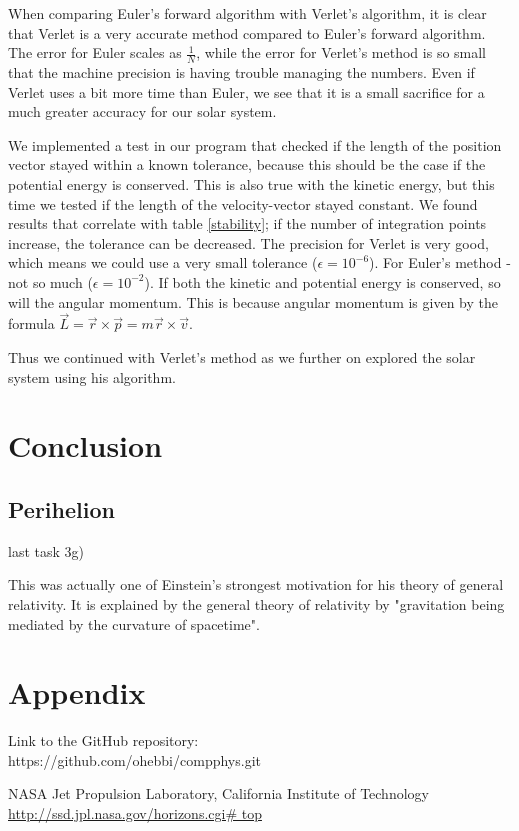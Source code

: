 \documentclass{article}
\begin{document}
When comparing Euler's forward algorithm with Verlet's algorithm, it is clear that Verlet is a very accurate method compared to Euler's forward algorithm. The error for Euler scales as $\frac{1}{N}$, while the error for Verlet's method is so small that the machine precision is having trouble managing the numbers. Even if Verlet uses a bit more time than Euler, we see that it is a small sacrifice for a much greater accuracy for our solar system.

We implemented a test in our program that checked if the length of the position vector stayed within a known tolerance, because this should be the case if the potential energy is conserved.
This is also true with the kinetic energy, but this time we tested if the length of the velocity-vector stayed constant. We found results that correlate with table \ref{stability}; if the number of integration points increase, the tolerance can be decreased. The precision for Verlet is very good, which means we could use a very small tolerance ($\epsilon = 10^{-6}$). For Euler's method - not so much ($\epsilon = 10^{-2}$).
If both the kinetic and potential energy is conserved, so will the angular momentum. This is because angular momentum is given by the formula $\vec{L}=\vec{r} \times \vec{p} =m \vec{r} \times \vec{v}$.


Thus we continued with Verlet's method as we further on explored the solar system using his algorithm.

\section{Conclusion}


\subsection{Perihelion}
last task 3g)

This was actually one of Einstein's strongest motivation for his theory of general relativity.
It is explained by the general theory of relativity by "gravitation being mediated by the curvature of spacetime".


\section{Appendix}
Link to the GitHub repository:\\

https://github.com/ohebbi/compphys.git

\begin{thebibliography}{}
NASA Jet Propulsion Laboratory, California Institute of Technology\\
\url{http://ssd.jpl.nasa.gov/horizons.cgi# top}

\end{thebibliography}
\end{document}
